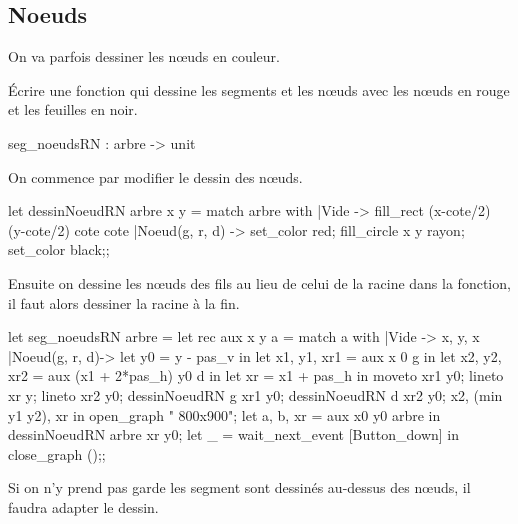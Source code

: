 \subsection{Noeuds}
\begin{minipage}{0.5\textwidth}
On va parfois dessiner les nœuds en couleur.
\begin{question}{}{}
Écrire une fonction  qui dessine les segments et les nœuds avec les nœuds en rouge et les feuilles en noir.
\begin{ocaml}
seg_noeudsRN : arbre -> unit
\end{ocaml}

\reponse

On commence par modifier le dessin des nœuds.
\begin{ocaml}
let dessinNoeudRN arbre x y =
    match arbre with
    |Vide ->  fill_rect (x-cote/2) (y-cote/2) cote cote
    |Noeud(g, r, d) ->  set_color red;
                        fill_circle x y rayon;
                        set_color black;;
\end{ocaml}

Ensuite on dessine les nœuds des fils au lieu de celui de la racine dans la fonction, il faut alors dessiner la racine à la fin.

\begin{ocaml}
let seg_noeudsRN arbre =
    let rec aux x y a =
        match a with
        |Vide -> x, y, x
        |Noeud(g, r, d)-> 
                let y0 = y - pas_v in
                let x1, y1, xr1 = aux x 0 g in
                let x2, y2, xr2 = aux (x1 + 2*pas_h) y0 d in
                let xr = x1 + pas_h in
                moveto xr1 y0;
                lineto xr y;
                lineto xr2 y0;
                dessinNoeudRN g xr1 y0;
                dessinNoeudRN d xr2 y0;
                 x2, (min y1 y2), xr in
    open_graph " 800x900";
    let a, b, xr = aux x0 y0 arbre 
      in dessinNoeudRN arbre xr y0;
    let _ = wait_next_event [Button_down] in close_graph ();;
\end{ocaml}
\newpage
\end{question}

Si on n'y prend pas garde les segment sont dessinés au-dessus des nœuds, il faudra adapter le dessin.
\end{minipage}

